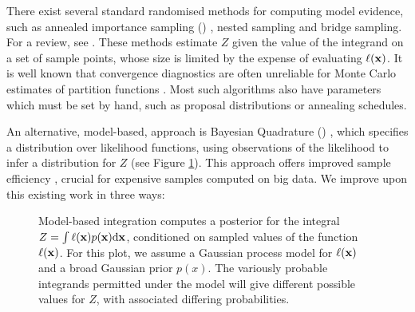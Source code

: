 \documentclass{article} %
\begin{document}
There exist several standard randomised methods for computing model evidence, such as annealed importance sampling () \cite{neal2001annealed}, nested sampling \cite{skilling2004nested} and bridge sampling.  For a review, see \cite{chen2000monte}.   These methods estimate $Z$ given the value of the integrand on a set of sample points, whose size is limited by the expense of evaluating $\ell(\vlfv)$.  It is well known that convergence diagnostics are often unreliable for Monte Carlo estimates of partition functions  \cite{NealMC, brooks1998convergence, cowles1999possible}.  Most such algorithms also have parameters which must be set by hand, such as proposal distributions or annealing schedules.


An alternative, model-based, approach is Bayesian Quadrature () \cite{stanford1986bayesian, BZHermiteQuadrature, kennedy1998bayesian, BZMonteCarlo}, which specifies a distribution over likelihood functions, using observations of the likelihood to infer a distribution for $Z$ (see Figure \ref{fig:model_based}). This approach offers improved sample efficiency \cite{BZMonteCarlo}, crucial for expensive samples computed on big data. We improve upon this existing work in three ways:

\begin{figure}
\centering
{}
\caption{Model-based integration computes a posterior for the integral $Z = \int \lfn(\vlfv) p(\vlfv) \ud\vlfv$, conditioned on sampled values of the function $\lfn(\vlfv)$. For this plot, we assume a Gaussian process model for $\lfn(\vlfv)$ and a broad Gaussian prior $p(x)$. The variously probable integrands permitted under the model will give different possible values for $Z$, with associated differing probabilities.}
\label{fig:model_based}
\end{figure}

\end{document}
